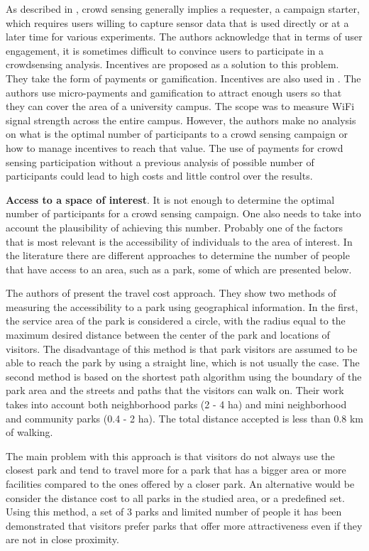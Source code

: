 As described in \cite{ra2012medusa}, crowd sensing generally implies a requester, a campaign starter, which requires users willing to capture sensor data that is used directly or at a later time for various experiments. The authors acknowledge that in terms of user engagement, it is sometimes difficult to convince users to participate in a crowdsensing analysis. Incentives are proposed as a solution to this problem. They take the form of payments or gamification. Incentives are also used in \cite{talasila2014crowdsensing}. The authors use micro-payments and gamification to attract enough users so that they can cover the area of a university campus. The scope was to measure WiFi signal strength across the entire campus. However, the authors make no analysis on what is the optimal number of participants to a crowd sensing campaign or how to manage incentives to reach that value. The use of payments for crowd sensing participation without a previous analysis of possible number of participants could lead to high costs and little control over the results.

\textbf{Access to a space of interest}.
It is not enough to determine the optimal number of participants for a crowd sensing campaign. One also needs to take into account the plausibility of achieving this number. Probably one of the factors that is most relevant is the accessibility of individuals to the area of interest. In the literature there are different approaches to determine the number of people that have access to an area, such as a park, some of which are presented below.

The authors of \cite{nicholls2001measuring} present the travel cost approach. They show two methods of measuring the accessibility to a park using geographical information. In the first, the service area of the park is considered a circle, with the radius equal to the maximum desired distance between the center of the park and locations of visitors. The disadvantage of this method is that park visitors are assumed to be able to reach the park by using a straight line, which is not usually the case. The second method is based on the shortest path algorithm using the boundary of the park area and the streets and paths that the visitors can walk on. Their work takes into account both neighborhood parks (2 - 4 ha) and mini neighborhood and community parks (0.4 - 2 ha). The total distance accepted is less than 0.8 km of walking.

The main problem with this approach is that visitors do not always use the closest park and tend to travel more for a park that has a bigger area or more facilities compared to the ones offered by a closer park. An alternative would be consider the distance cost to all parks in the studied area, or a predefined set. Using this method, a set of 3 parks and limited number of people it has been demonstrated \cite{iamtrakul2005public} that visitors prefer parks that offer more attractiveness even if they are not in close proximity.

